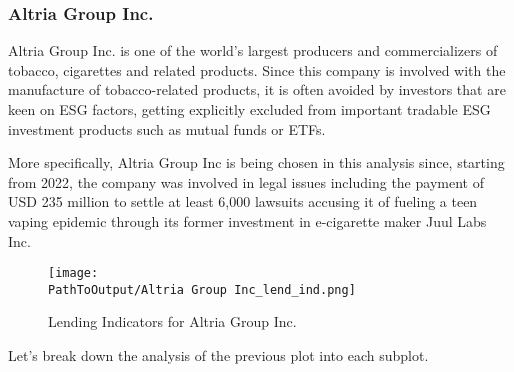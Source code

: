 \subsubsection{Altria Group Inc.}

Altria Group Inc. is one of the world's largest producers and commercializers of tobacco, cigarettes and related products. Since this company is involved with the manufacture of tobacco-related products, it is often avoided by investors that are keen on ESG factors, getting explicitly excluded from important tradable ESG investment products such as mutual funds or ETFs.

More specifically, Altria Group Inc is being chosen in this analysis since, starting from 2022, the company was involved in legal issues including the payment of USD 235 million to settle at least 6,000 lawsuits accusing it of fueling a teen vaping epidemic through its former investment in e-cigarette maker Juul Labs Inc.

\begin{figure}[H]
	\centering
	\caption{Lending Indicators for Altria Group Inc.}
	  \centering
	  \texttt{[image: \\PathToOutput/Altria Group Inc\_lend\_ind.png]}
	\label{fig:altria_lending_indicators}
\end{figure}

Let's break down the analysis of the previous plot into each subplot.

